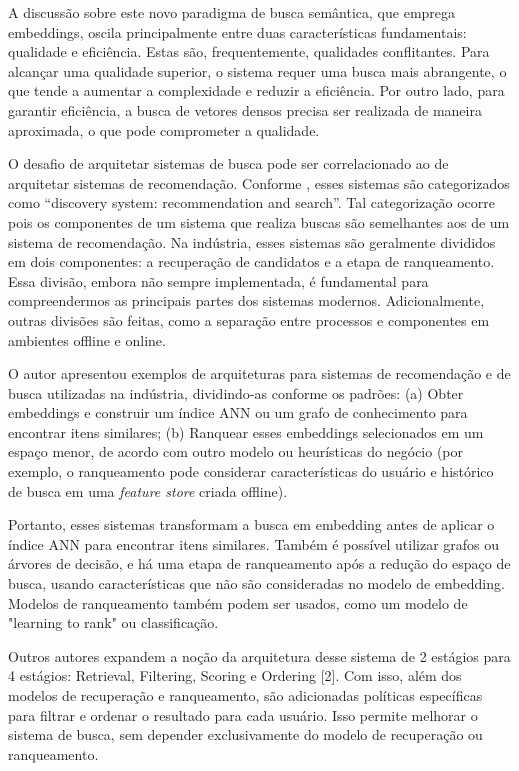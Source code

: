 \documentclass[
	12pt,				%
	openright,			%
	oneside,			%
	a4paper,			%
	english,			%
	french,				%
	spanish,			%
	brazil				%
	]{abntex2}
\begin{document}
A discussão sobre este novo paradigma de busca semântica, que emprega embeddings,
oscila principalmente entre duas características fundamentais: qualidade e eficiência.
Estas são, frequentemente, qualidades conflitantes. Para alcançar uma qualidade superior,
o sistema requer uma busca mais abrangente, o que tende a aumentar a complexidade e reduzir a eficiência.
Por outro lado, para garantir eficiência, a busca de vetores densos precisa ser realizada de maneira aproximada,
o que pode comprometer a qualidade.

O desafio de arquitetar sistemas de busca pode ser correlacionado ao de arquitetar sistemas de recomendação.
Conforme \citeauthor{yan2021system}, esses sistemas são categorizados como ``discovery system: recommendation and search''.
Tal categorização ocorre pois os componentes de um sistema que realiza buscas são semelhantes aos de um sistema de
recomendação.
Na indústria, esses sistemas são geralmente divididos em dois componentes: a recuperação de candidatos e a etapa de
ranqueamento.
Essa divisão, embora não sempre implementada, é fundamental para compreendermos as principais partes dos sistemas modernos.
Adicionalmente, outras divisões são feitas, como a separação entre processos e componentes em ambientes offline e online.

O autor \citeauthor{yan2021system} apresentou exemplos de arquiteturas para sistemas de recomendação e de busca
utilizadas na indústria,
dividindo-as conforme os padrões: (a) Obter embeddings e construir um índice ANN ou um grafo de conhecimento para
encontrar itens similares; (b) Ranquear esses embeddings selecionados em um espaço menor, de acordo com outro modelo
ou heurísticas do negócio (por exemplo, o ranqueamento pode considerar características do usuário e histórico de busca
em uma \textit{feature store} criada offline).

Portanto, esses sistemas transformam a busca em embedding antes de aplicar o índice ANN para encontrar itens similares.
Também é possível utilizar grafos ou árvores de decisão, e há uma etapa de ranqueamento após a redução do espaço de
busca, usando características que não são consideradas no modelo de embedding. Modelos de ranqueamento também podem
ser usados, como um modelo de "learning to rank" ou classificação.

Outros autores expandem a noção da arquitetura desse sistema de 2 estágios para 4 estágios: Retrieval, Filtering,
Scoring e Ordering [2].
Com isso, além dos modelos de recuperação e ranqueamento, são adicionadas políticas
específicas para filtrar e ordenar o resultado para cada usuário. Isso permite melhorar o sistema de busca,
sem depender exclusivamente do modelo de recuperação ou ranqueamento.
\end{document}
